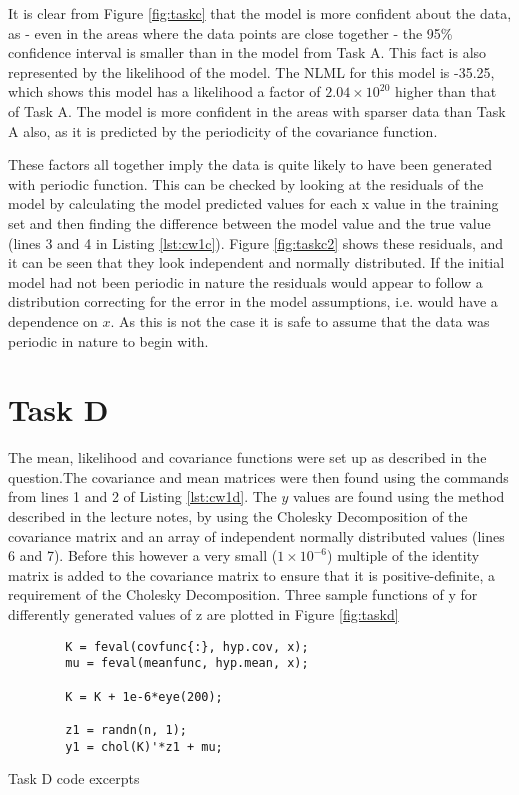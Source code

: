\documentclass[11pt]{amsart}
\begin{document}
It is clear from Figure \ref{fig:taskc} that the model is more confident about the data, as - even in the areas where the data points are close together - the 95\% confidence interval is smaller than in the model from Task A. This fact is also represented by the likelihood of the model. The NLML for this model is -35.25, which shows this model has a likelihood a factor of $2.04\times10^{20}$ higher than that of Task A. The model is more confident in the areas with sparser data than Task A also, as it is predicted by the periodicity of the covariance function. 

These factors all together imply the data is quite likely to have been generated with periodic function. This can be checked by looking at the residuals of the model by calculating the model predicted values for each x value in the training set and then finding the difference between the model value and the true value (lines 3 and 4 in Listing \ref{lst:cw1c}). Figure \ref{fig:taskc2} shows these residuals, and it can be seen that they look independent and normally distributed. If the initial model had not been periodic in nature the residuals would appear to follow a distribution correcting for the error in the model assumptions, i.e. would have a dependence on $x$. As this is not the case it is safe to assume that the data was periodic in nature to begin with. 

\section{Task D}
The mean, likelihood and covariance functions were set up as described in the question.The covariance and mean matrices were then found using the commands from lines 1 and 2 of Listing \ref{lst:cw1d}. The $y$ values are found using the method described in the lecture notes, by using the Cholesky Decomposition of the covariance matrix and an array of independent normally distributed values (lines 6 and 7). Before this however a very small ($1\times10^{-6}$) multiple of the identity matrix is added to the covariance matrix to ensure that it is positive-definite, a requirement of the Cholesky Decomposition. Three sample functions of y for differently generated values of z are plotted in Figure \ref{fig:taskd}


\begin{listing}[H]
    \begin{verbatim}
        K = feval(covfunc{:}, hyp.cov, x);
        mu = feval(meanfunc, hyp.mean, x);

        K = K + 1e-6*eye(200);

        z1 = randn(n, 1);
        y1 = chol(K)'*z1 + mu;
    \end{verbatim}
    \caption{Task D code excerpts} \label{lst:cw1d}
\end{listing}
\end{document}
